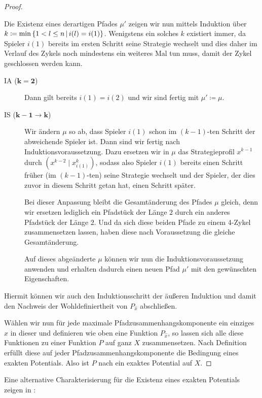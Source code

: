 \begin{proof}
\begin{description}
		Die Existenz eines derartigen Pfades $\mu'$ zeigen wir nun mittels Induktion über $k \coloneqq \min\left\{1 < l \leq n \,\middle|\, i(l) = i(1)\right\}$. Wenigstens ein solches $k$ existiert immer, da Spieler $i(1)$ bereits im ersten Schritt seine Strategie wechselt und dies daher im Verlauf des Zykels noch mindestens ein weiteres Mal tun muss, damit der Zykel geschlossen werden kann.
		\begin{description}
			\item[IA ($\bm{k=2}$)] Dann gilt bereits $i(1)=i(2)$ und wir sind fertig mit $\mu' \coloneqq \mu$.
			\item[IS ($\bm{k-1\to k}$)] Wir ändern $\mu$ so ab, dass Spieler $i(1)$ schon im $(k-1)$-ten Schritt der abweichende Spieler ist. Dann sind wir fertig nach Induktionsvoraussetzung. Dazu ersetzen wir in $\mu$ das Strategieprofil $x^{k-1}$ durch $(x^{k-2} \mid x^{k}_{i(1)})$, sodass also Spieler $i(1)$ bereits einen Schritt früher (im $(k-1)$-ten) seine Strategie wechselt und der Spieler, der dies zuvor in diesem Schritt getan hat, einen Schritt später.
			
			Bei dieser Anpassung bleibt die Gesamtänderung des Pfades $\mu$ gleich, denn wir ersetzen lediglich ein Pfadstück der Länge $2$ durch ein anderes Pfadstück der Länge $2$. Und da sich diese beiden Pfade zu einem 4-Zykel zusammensetzen lassen, haben diese nach Voraussetzung die gleiche Gesamtänderung.
			
			Auf dieses abgeänderte $\mu$ können wir nun die Induktionsvoraussetzung anwenden und erhalten dadurch einen neuen Pfad $\mu'$ mit den gewünschten Eigenschaften.
		\end{description}
		Hiermit können wir auch den Induktionsschritt der äußeren Induktion und damit den Nachweis der Wohldefiniertheit von $P_{\hat{x}}$ abschließen. 
	\end{description}	
	Wählen wir nun für jede maximale Pfadzusammenhangskomponente ein einziges $\hat{x}$ in dieser und definieren wie oben eine Funktion $P_{\hat{x}}$, so lassen sich alle diese Funktionen zu einer Funktion $P$ auf ganz $X$ zusammensetzen. Nach Definition erfüllt diese auf jeder Pfadzusammenhangskomponente die Bedingung eines exakten Potentials. Also ist $P$ nach  ein exaktes Potential auf $X$.
\end{proof}

Eine alternative Charakterisierung für die Existenz eines exakten Potentials zeigen \citeauthor{KoordDummy} in \cite[Theorem 2.1]{KoordDummy}:

